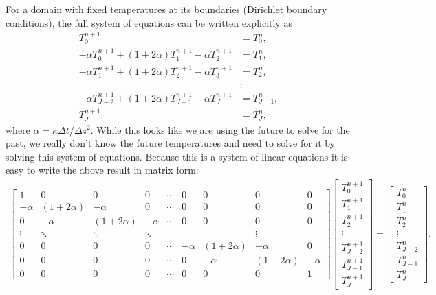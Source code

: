 For a domain with fixed temperatures at its boundaries (Dirichlet boundary conditions), the full system of equations can be written explicitly as
\begin{align*}
    T_0^{n+1} &= T_0^{n}, \\
    -\alpha T_{0}^{n+1} + (1 + 2\alpha) T_1^{n+1} - \alpha T_{2}^{n+1} &= T_1^n, \\
    -\alpha T_{1}^{n+1} + (1 + 2\alpha) T_2^{n+1} - \alpha T_{3}^{n+1} &= T_2^n, \\
    &\vdots \\
    -\alpha T_{J-2}^{n+1} + (1 + 2\alpha) T_{J-1}^{n+1} - \alpha T_{J}^{n+1} &= T_{J-1}^n, \\
    T_J^{n+1} &= T_J^{n},
\end{align*}
where $\alpha = \kappa \Delta t / \Delta z^2$.  While this looks like we are using the future to solve for the past, we really don't know the future temperatures and need to solve for it by solving this system of equations.  Because this is a system of linear equations it is easy to write the above result in matrix form:
\begin{align*}
    \begin{bmatrix}
        1 & 0 & 0 & 0 & \cdots & 0 & 0 & 0 & 0 \\
        -\alpha & (1 + 2\alpha) & -\alpha & 0 & \cdots & 0 & 0 & 0 & 0 \\
        0 & -\alpha & (1 + 2\alpha) & -\alpha & \cdots & 0 & 0 & 0 & 0 \\
        \vdots & \ddots & \ddots & \ddots & & & & \vdots \\
        0 & 0 & 0 & 0 & \cdots & -\alpha & (1 + 2\alpha) & -\alpha & 0 \\
        0 & 0 & 0 & 0 & \cdots & 0 & -\alpha & (1 + 2\alpha) & -\alpha \\
        0 & 0 & 0 & 0 & \cdots & 0 & 0 & 0 & 1
    \end{bmatrix}
    \begin{bmatrix}
        T_{0}^{n+1} \\
        T_{1}^{n+1} \\
        T_{2}^{n+1} \\
        \vdots \\
        T_{J-2}^{n+1} \\
        T_{J-1}^{n+1} \\
        T_{J}^{n+1}
    \end{bmatrix}
    = \begin{bmatrix}
        T_{0}^n \\
        T_{1}^n \\
        T_{2}^n \\
        \vdots \\
        T_{J-2}^n \\
        T_{J-1}^n \\
        T_{J}^n
    \end{bmatrix}.
\end{align*}
